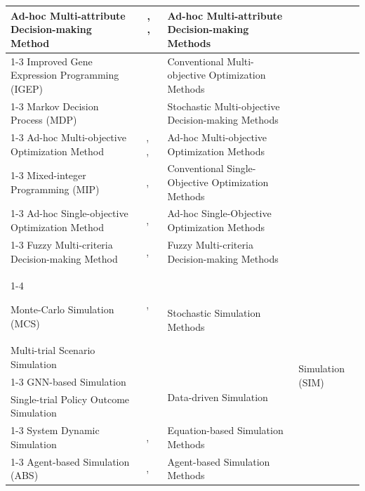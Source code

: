 \documentclass{sfuthesis}
\begin{document}
\begin{appendices}
\begin{landscape}
\begin{longtable}{
p{5.5cm}
p{4cm}
p{6cm}
p{3.5cm}
}
Ad-hoc Multi-attribute Decision-making Method &
~\cite{amiri2024variant}, ~\cite{Monti2025RailwayBridgeDSS}, ~\cite{xue2022data} &
Ad-hoc Multi-attribute Decision-making Methods &
\\
\cline{1-3}
Improved Gene Expression Programming (IGEP) &
~\cite{zhang2021data} &
Conventional Multi-objective Optimization Methods &
\\
\cline{1-3}
Markov Decision Process (MDP) &
~\cite{svavza2024data} &
Stochastic Multi-objective Decision-making Methods &
\\
\cline{1-3}
Ad-hoc Multi-objective Optimization Method &
~\cite{Sheikhkhoshkar2025ConstructionDSS}, ~\cite{SalasMolina2018CashManagement}, ~\cite{miao2025research} &
Ad-hoc Multi-objective Optimization Methods &
\\
\cline{1-3}
Mixed-integer Programming (MIP) &
~\cite{tao2025data}, ~\cite{beykal2022data} &
Conventional Single-Objective Optimization Methods &
\\
\cline{1-3}
Ad-hoc Single-objective Optimization Method &
~\cite{feng2024adaptive}, ~\cite{wang2026intelligent} &
Ad-hoc Single-Objective Optimization Methods &
\\
\cline{1-3}
Fuzzy Multi-criteria Decision-making Method &
~\cite{gaftandzhieva2023data}, ~\cite{xue2022data} &
Fuzzy Multi-criteria Decision-making Methods &
\\
\cline{1-4}

Monte-Carlo Simulation (MCS) &
~\cite{Ma2020EquipmentMaintenance}, ~\cite{cecconi2022data} &
\multirow{2}{6cm}{Stochastic Simulation Methods}
&
\multirow{6}{3.5cm}{Simulation (SIM)}
\\

Multi-trial Scenario Simulation &
~\cite{ryan2014data} &
&
\\
\cline{1-3}
GNN-based Simulation &
~\cite{li2024optimal} &
\multirow{2}{6cm}{Data-driven Simulation}
&
\\

Single-trial Policy Outcome Simulation &
~\cite{chorev2017data} &
&
\\
\cline{1-3}
System Dynamic Simulation &
~\cite{Hu2023MegaInfrastructure}, ~\cite{kuhl2020data} &
Equation-based Simulation Methods &
\\
\cline{1-3}
Agent-based Simulation (ABS) &
~\cite{ElNouty2024LearningModel}, ~\cite{long2018data} &
Agent-based Simulation Methods &
\\
\end{longtable}
\end{landscape}

\end{appendices}
\end{document}
